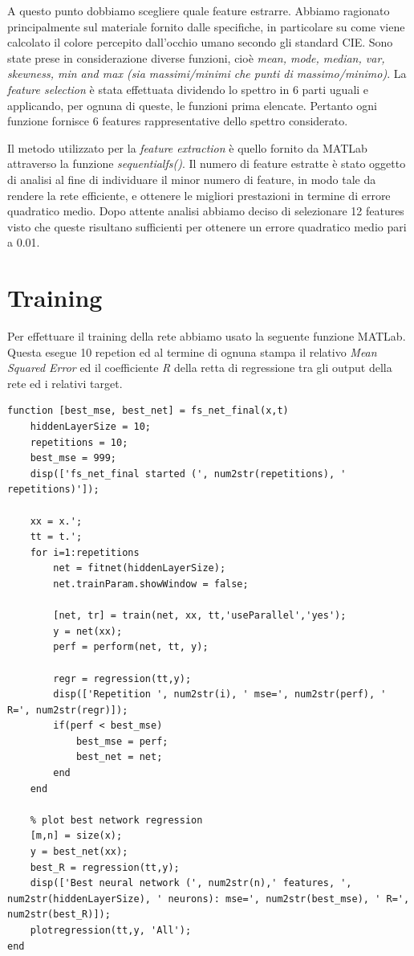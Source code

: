 A questo punto dobbiamo scegliere quale feature estrarre. Abbiamo ragionato principalmente sul materiale fornito dalle specifiche, in particolare su come viene calcolato il colore percepito dall'occhio umano secondo gli standard CIE. Sono state prese in considerazione diverse funzioni, cioè \textit{mean, mode, median, var, skewness, min and max (sia massimi/minimi che punti di massimo/minimo)}. La \textit{feature selection} è stata effettuata dividendo lo spettro in 6 parti uguali e applicando, per ognuna di queste, le funzioni prima elencate. Pertanto ogni funzione fornisce 6 features rappresentative dello spettro considerato.

Il metodo utilizzato per la \textit{feature extraction} è quello fornito da MATLab attraverso la funzione \textit{sequentialfs()}. Il numero di feature estratte è stato oggetto di analisi al fine di individuare il minor numero di feature, in modo tale da rendere la rete efficiente, e ottenere le migliori prestazioni in termine di errore quadratico medio. Dopo attente analisi abbiamo deciso di selezionare 12 features visto che queste risultano sufficienti per ottenere un errore quadratico medio pari a 0.01.

\section{Training}
Per effettuare il training della rete abbiamo usato la seguente funzione MATLab. Questa esegue 10 repetion ed al termine di ognuna stampa il relativo \textit{Mean Squared Error} ed il coefficiente \textit{R} della retta di regressione tra gli output della rete ed i relativi target.
\begin{lstlisting}
function [best_mse, best_net] = fs_net_final(x,t)
	hiddenLayerSize = 10;
    repetitions = 10;
    best_mse = 999;
    disp(['fs_net_final started (', num2str(repetitions), ' repetitions)']);

    xx = x.';
	tt = t.';
    for i=1:repetitions
        net = fitnet(hiddenLayerSize);
        net.trainParam.showWindow = false;

        [net, tr] = train(net, xx, tt,'useParallel','yes');
        y = net(xx);
        perf = perform(net, tt, y);

        regr = regression(tt,y);
        disp(['Repetition ', num2str(i), ' mse=', num2str(perf), ' R=', num2str(regr)]);
        if(perf < best_mse)
            best_mse = perf;
            best_net = net;
        end
    end

    % plot best network regression
    [m,n] = size(x);
    y = best_net(xx);
    best_R = regression(tt,y); 
    disp(['Best neural network (', num2str(n),' features, ', num2str(hiddenLayerSize), ' neurons): mse=', num2str(best_mse), ' R=', num2str(best_R)]);
    plotregression(tt,y, 'All');
end
\end{lstlisting}

